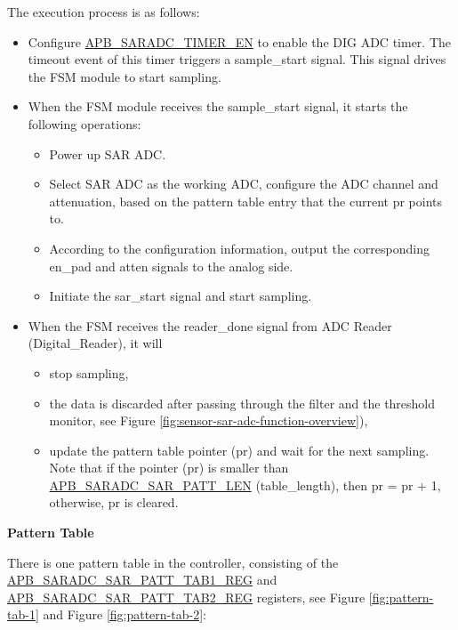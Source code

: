 \documentclass[main\_\_EN.tex]{subfiles}
\begin{document}
The execution process is as follows:
\begin{itemize}
\item Configure  \hyperref[fielddesc:APBSARADCSARADCTIMEREN]{APB\_SARADC\_TIMER\_EN} to enable the DIG ADC timer. The timeout event of this timer triggers a sample\_start signal. This signal drives the FSM module to start sampling.
\item When the FSM module receives the sample\_start signal, it starts the following operations:
\begin{itemize}
    \item Power up SAR ADC.
    \item Select SAR ADC as the working ADC, configure the ADC channel and attenuation, based on the pattern table entry that the current pr points to.
    \item According to the configuration information, output the corresponding en\_pad and atten signals to the analog side.
    \item Initiate the sar\_start signal and start sampling.
\end{itemize}

    \item When the FSM receives the reader\_done signal from ADC Reader (Digital\_Reader), it will
    \begin{itemize}
        \item stop sampling,
        \item the data is discarded after passing through the filter and the threshold monitor, see Figure \ref{fig:sensor-sar-adc-function-overview}),
        \item update the pattern table pointer (pr) and wait for the next sampling. Note that if the pointer (pr) is smaller than \hyperref[fielddesc:APBSARADCSARADCSARPATTLEN]{APB\_SARADC\_SAR\_PATT\_LEN} (table\_length), then pr = pr + 1, otherwise, pr is cleared.
    \end{itemize}
\end{itemize}




\textbf{Pattern Table}

There is one pattern table in the controller, consisting of the \hyperref[regdesc:APBSARADCSARPATTTAB1REG]{APB\_SARADC\_SAR\_PATT\_TAB1\_REG} and \hyperref[regdesc:APBSARADCSARPATTTAB1REG]{APB\_SARADC\_SAR\_PATT\_TAB2\_REG} registers, see Figure \ref{fig:pattern-tab-1} and Figure \ref{fig:pattern-tab-2}:
\end{document}
